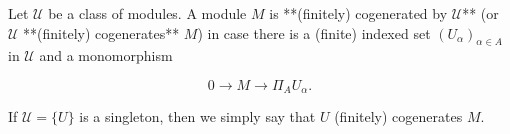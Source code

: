 Let $\mathcal{U}$ be a class of modules. A module $M$ is **(finitely) cogenerated by $\mathcal{U}$** (or $\mathcal{U}$ **(finitely) cogenerates** $M$) in case there is a (finite) indexed set $(U_\alpha)_{\alpha \in A}$ in $\mathcal{U}$ and a monomorphism

$$0 \to M \to \Pi_A U_\alpha.$$

If $\mathcal{U} = \{U\}$ is a singleton, then we simply say that $U$ (finitely) cogenerates $M$.
